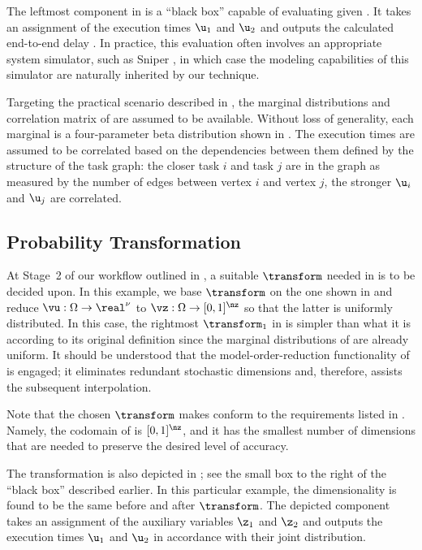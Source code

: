The leftmost component in  is a ``black box'' capable of
evaluating \g given \vu. It takes an assignment of the execution times $\u_1$
and $\u_2$ and outputs the calculated end-to-end delay \g. In practice, this
evaluation often involves an appropriate system simulator, such as Sniper
\cite{carlson2011}, in which case the modeling capabilities of this simulator
are naturally inherited by our technique.

Targeting the practical scenario described in , the
marginal distributions and correlation matrix of \vu are assumed to be
available. Without loss of generality, each marginal is a four-parameter beta
distribution shown in . The execution times are assumed
to be correlated based on the dependencies between them defined by the structure
of the task graph: the closer task $i$ and task $j$ are in the graph as measured
by the number of edges between vertex $i$ and vertex $j$, the stronger $\u_i$
and $\u_j$ are correlated.

\subsection{Probability Transformation}

At Stage~2 of our workflow outlined in , a suitable
$\transform$ needed in  is to be decided upon. In
this example, we base $\transform$ on the one shown in
 and reduce $\vu: \Omega \to \real^\nu$ to
$\vz: \Omega \to [0, 1]^\nz$ so that the latter is uniformly distributed. In
this case, the rightmost $\transform_1$ in  is
simpler than what it is according to its original definition since the marginal
distributions of \vz are already uniform. It should be understood that the
model-order-reduction functionality of  is
engaged; it eliminates redundant stochastic dimensions and, therefore, assists
the subsequent interpolation.

Note that the chosen $\transform$ makes \vz conform to the requirements listed
in . Namely, the codomain of \vz is $[0, 1]^\nz$, and
it has the smallest number of dimensions that are needed to preserve the desired
level of accuracy.

The transformation is also depicted in ; see the small
box to the right of the ``black box'' described earlier. In this particular
example, the dimensionality is found to be the same before and after
$\transform$. The depicted component takes an assignment of the auxiliary
variables $\z_1$ and $\z_2$ and outputs the execution times $\u_1$ and $\u_2$ in
accordance with their joint distribution.

